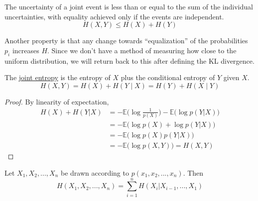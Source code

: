     \begin{theorem}
      \label{thm:joint-entropy}
      The uncertainty of a joint event is less than or equal to the sum of the individual uncertainties, with equality achieved only if the events are independent. 
      \begin{equation}
        H(X, Y) \leq H(X) + H(Y)
      \end{equation}
    \end{theorem}

    Another property is that any change towards ``equalization'' of the probabilities $p_i$ increases $H$. Since we don't have a method of measuring how close to the uniform distribution, we will return back to this after defining the KL divergence.  

    \begin{theorem}
      \label{thm:chain-rule-of-entropy}
      The \hyperref[thm:joint-entropy]{joint entropy} is the entropy of $X$ plus the conditional entropy of $Y$ given $X$. 
      \begin{equation}
        H(X, Y) = H(X) + H(Y \mid X) = H(Y) + H(X \mid Y)
      \end{equation}
    \end{theorem}
    \begin{proof}
      By linearity of expectation, 
      \begin{align*}
        H(X) + H(Y|X) & = - \mathbb{E} \Big( \log \frac{1}{p(X)}\Big) - \mathbb{E} \big( \log p(Y|X)\big) \\
        & = - \mathbb{E} \big( \log p(X) + \log p (Y|X) \big) \\
        & = - \mathbb{E} \big( \log p(X) p(Y|X)\big) \\
        & = - \mathbb{E} \big( \log p(X, Y) \big) = H(X, Y)
      \end{align*}
    \end{proof}

    \begin{corollary}
      \label{thm:chain-rule-for-entropy}
      Let $X_1, X_2, ..., X_n$ be drawn according to $p(x_1, x_2, ..., x_n)$. Then 
      \begin{equation}
        H(X_1, X_2, ..., X_n) = \sum_{i = 1}^n H(X_i | X_{i-1}, ..., X_1)
      \end{equation}
    \end{corollary}

